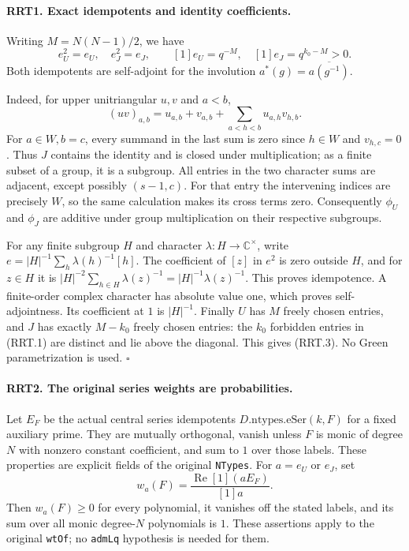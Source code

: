 \paragraph{RRT1. Exact idempotents and identity coefficients.}
\label{claim:RRT1}
Writing $M=N(N-1)/2$, we have
\[
 e_U^2=e_U,\quad e_J^2=e_J,\qquad
 [1]e_U=q^{-M},\quad [1]e_J=q^{k_0-M}>0.
 \tag{RRT.3}
\]
Both idempotents are self-adjoint for the involution
$a^*(g)=\overline{a(g^{-1})}$.

Indeed, for upper unitriangular $u,v$ and $a<b$,
\[
 (uv)_{a,b}=u_{a,b}+v_{a,b}
                  +\sum_{a<h<b}u_{a,h}v_{h,b}.
 \tag{RRT.4}
\]
For $a\in W,b=c$, every summand in the last sum is zero since
$h\in W$ and $v_{h,c}=0$.  Thus $J$ contains the identity and is
closed under multiplication; as a finite subset of a group, it is a
subgroup.  All entries in the two character sums are adjacent,
except possibly $(s-1,c)$.  For that entry the intervening indices
are precisely $W$, so the same calculation makes its cross terms
zero.  Consequently $\phi_U$ and $\phi_J$ are additive under
group multiplication on their respective subgroups.

For any finite subgroup $H$ and character $\lambda:H\to\mathbb C^\times$,
write $e=|H|^{-1}\sum_h\lambda(h)^{-1}[h]$.
The coefficient of $[z]$ in $e^2$ is zero outside
$H$, and for $z\in H$ it is
$|H|^{-2}\sum_{h\in H}\lambda(z)^{-1}=|H|^{-1}\lambda(z)^{-1}$.
This proves idempotence.  A finite-order complex character has
absolute value one, which proves self-adjointness.  Its coefficient
at $1$ is $|H|^{-1}$.  Finally $U$ has $M$ freely chosen entries,
and $J$ has exactly $M-k_0$ freely chosen entries: the $k_0$
forbidden entries in (RRT.1) are distinct and lie above the diagonal.
This gives (RRT.3).  No Green parametrization is used.
\hfill$\square$

\paragraph{RRT2. The original series weights are probabilities.}
\label{claim:RRT2}
Let $E_F$ be the actual central series idempotents
$D.\mathrm{ntypes}.\mathrm{eSer}(k,F)$ for a fixed auxiliary prime.
They are mutually orthogonal, vanish unless $F$ is monic of degree
$N$ with nonzero constant coefficient, and sum to $1$ over those
labels.  These properties are explicit fields of the original
\texttt{NTypes}.  For $a=e_U$ or $e_J$, set
\[
             w_a(F)=\frac{\operatorname{Re}[1](aE_F)}{[1]a}.
 \tag{RRT.5}
\]
Then $w_a(F)\ge0$ for every polynomial, it vanishes off the stated
labels, and its sum over all monic degree-$N$ polynomials is $1$.
These assertions apply to the original \texttt{wtOf}; no
\texttt{admLq} hypothesis is needed for them.

